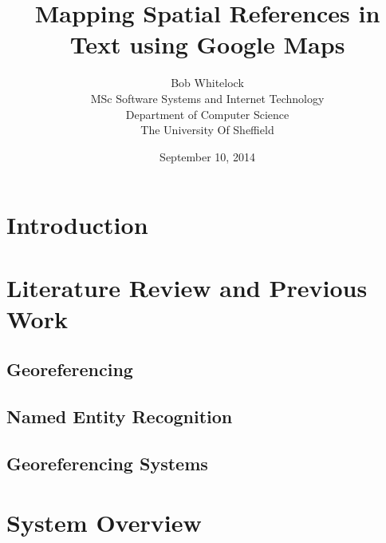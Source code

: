 \documentclass[12pt, a4paper]{report}
\title{Mapping Spatial References in Text using Google Maps}
\date{September 10, 2014}
\author{Bob Whitelock\\ MSc Software Systems and Internet Technology\\ Department of Computer Science\\ The University Of Sheffield}
\begin{document}
\maketitle

\begin{abstract}

\end{abstract}

\tableofcontents


\chapter{Introduction}




\chapter{Literature Review and Previous Work}


\section{Georeferencing}

\cite{hill2006}

\section{Named Entity Recognition}

\section{Georeferencing Systems}


\chapter{System Overview}
\end{document}
